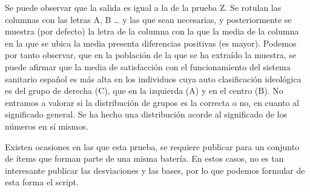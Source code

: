 \documentclass[
]{book}
\begin{document}
Se puede observar que la salida es igual a la de la prueba Z. Se rotulan las columnas con las letras A, B \ldots{} y las que sean necesarias, y posteriormente se muestra (por defecto) la letra de la columna con la que la media de la columna en la que se ubica la media presenta diferencias positivas (es mayor). Podemos por tanto observar, que en la población de la que se ha extraído la muestra, se puede afirmar que la media de satisfacción con el funcionamiento del sistema sanitario español es más alta en los individuos cuya auto clasificación ideológica es del grupo de derecha (C), que en la izquierda (A) y en el centro (B). No entramos a valorar si la distribución de grupos es la correcta o no, en cuanto al significado general. Se ha hecho una distribución acorde al significado de los números en sí mismos.

Existen ocasiones en las que esta prueba, se requiere publicar para un conjunto de ítems que forman parte de una misma batería. En estos casos, no es tan interesante publicar las desviaciones y las bases, por lo que podemos formular de esta forma el script.
\end{document}
